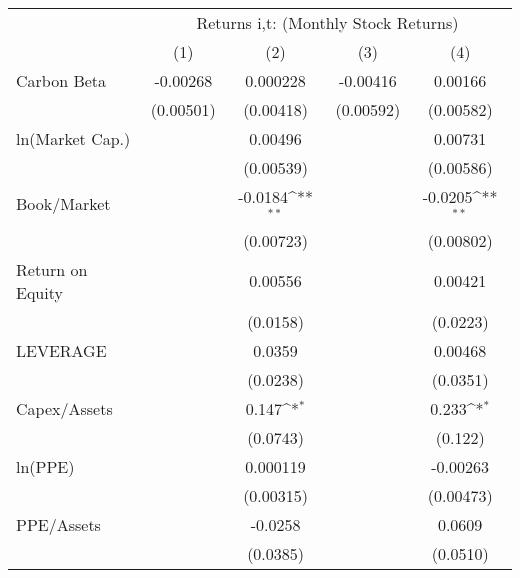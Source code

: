 {
\def\sym#1{\ifmmode^{#1}\else\(^{#1}\)\fi}
\begin{tabular}{l*{4}{c}}
\hline\hline
                &\multicolumn{4}{c}{Returns i,t: (Monthly Stock Returns) }                  \\\cmidrule(lr){2-5}
                &\multicolumn{1}{c}{(1)}         &\multicolumn{1}{c}{(2)}         &\multicolumn{1}{c}{(3)}         &\multicolumn{1}{c}{(4)}         \\
\hline
Carbon Beta     & -0.00268         & 0.000228         & -0.00416         &  0.00166         \\
                &(0.00501)         &(0.00418)         &(0.00592)         &(0.00582)         \\
ln(Market Cap.) &                  &  0.00496         &                  &  0.00731         \\
                &                  &(0.00539)         &                  &(0.00586)         \\
Book/Market     &                  &  -0.0184\sym{**} &                  &  -0.0205\sym{**} \\
                &                  &(0.00723)         &                  &(0.00802)         \\
Return on Equity&                  &  0.00556         &                  &  0.00421         \\
                &                  & (0.0158)         &                  & (0.0223)         \\
LEVERAGE        &                  &   0.0359         &                  &  0.00468         \\
                &                  & (0.0238)         &                  & (0.0351)         \\
Capex/Assets    &                  &    0.147\sym{*}  &                  &    0.233\sym{*}  \\
                &                  & (0.0743)         &                  &  (0.122)         \\
ln(PPE)         &                  & 0.000119         &                  & -0.00263         \\
                &                  &(0.00315)         &                  &(0.00473)         \\
PPE/Assets      &                  &  -0.0258         &                  &   0.0609         \\
                &                  & (0.0385)         &                  & (0.0510)         \\

\end{tabular}}
